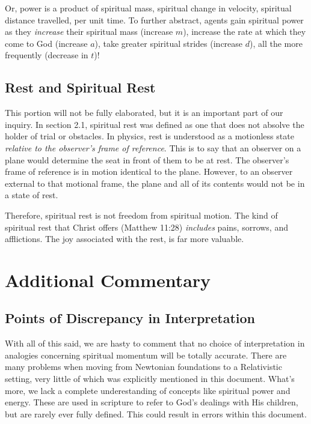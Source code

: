 \documentclass{article}
\begin{document}
                Or, power is a product of spiritual mass, spiritual change in velocity, spiritual distance travelled, per unit time.
                To further abstract, agents gain spiritual power as they \emph{increase} their spiritual mass (increase $m$), increase the rate at which they come to God (increase $a$), take greater spiritual strides (increase $d$), all the more frequently (decrease in $t$)!
                
            \subsection{Rest and Spiritual Rest}
                This portion will not be fully elaborated, but it is an important part of our inquiry.
                In section 2.1, spiritual rest was defined as one that does not absolve the holder of trial or obstacles. 
                In physics, rest is understood as a motionless state \emph{relative to the observer's frame of reference}. This is to say that an observer on a plane would determine the seat in front of them to be at rest. 
                The observer's frame of reference is in motion identical to the plane. However, to an observer external to that motional frame, the plane and all of its contents would not be in a state of rest.

                Therefore, spiritual rest is not freedom from spiritual motion. The kind of spiritual rest that Christ offers (Matthew 11:28) \emph{includes} pains, sorrows, and afflictions. The joy associated with the rest, is far more valuable. 
\newpage

    \section{Additional Commentary}
            \subsection{Points of Discrepancy in Interpretation}
                With all of this said, we are hasty to comment that no choice of interpretation in analogies concerning spiritual momentum will be totally accurate. 
                There are many problems when moving from Newtonian foundations to a Relativistic setting, very little of which was explicitly mentioned in this document. 
                What's more, we lack a complete underestanding of concepts like spiritual power and energy. These are used in scripture to refer to God's dealings with His children, but are rarely ever fully defined. 
                This could result in errors within this document.
\end{document}
